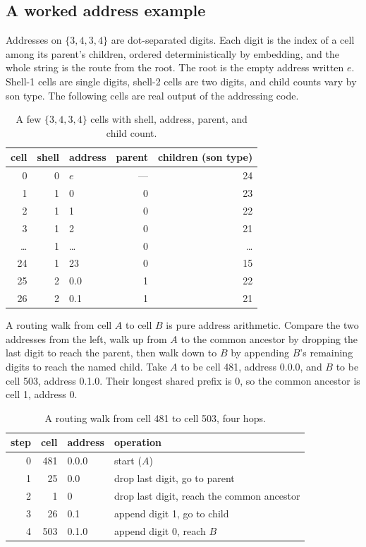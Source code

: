\subsection{A worked address example}

Addresses on $\{3,4,3,4\}$ are dot-separated digits. Each digit is the index of a cell among its parent's children, ordered deterministically by embedding, and the whole string is the route from the root. The root is the empty address written $e$. Shell-1 cells are single digits, shell-2 cells are two digits, and child counts vary by son type. The following cells are real output of the addressing code.

\begin{table}[ht]
\centering
\begin{tabular}{@{}rrlrr@{}}
\toprule
cell & shell & address & parent & children (son type) \\
\midrule
0  & 0 & $e$   & --- & 24 \\
1  & 1 & 0   & 0 & 23 \\
2  & 1 & 1   & 0 & 22 \\
3  & 1 & 2   & 0 & 21 \\
\dots & 1 & \dots & 0 & \dots \\
24 & 1 & 23  & 0 & 15 \\
25 & 2 & 0.0 & 1 & 22 \\
26 & 2 & 0.1 & 1 & 21 \\
\bottomrule
\end{tabular}
\caption{A few $\{3,4,3,4\}$ cells with shell, address, parent, and child count.}
\end{table}

A routing walk from cell $A$ to cell $B$ is pure address arithmetic. Compare the two addresses from the left, walk up from $A$ to the common ancestor by dropping the last digit to reach the parent, then walk down to $B$ by appending $B$'s remaining digits to reach the named child. Take $A$ to be cell 481, address 0.0.0, and $B$ to be cell 503, address 0.1.0. Their longest shared prefix is 0, so the common ancestor is cell 1, address 0.

\begin{table}[ht]
\centering
\begin{tabular}{@{}rrll@{}}
\toprule
step & cell & address & operation \\
\midrule
0 & 481 & 0.0.0 & start ($A$) \\
1 & 25  & 0.0   & drop last digit, go to parent \\
2 & 1   & 0     & drop last digit, reach the common ancestor \\
3 & 26  & 0.1   & append digit 1, go to child \\
4 & 503 & 0.1.0 & append digit 0, reach $B$ \\
\bottomrule
\end{tabular}
\caption{A routing walk from cell 481 to cell 503, four hops.}
\end{table}

